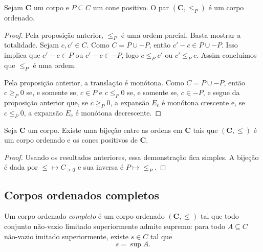 \begin{proposition}
Sejam $\bm C$ um corpo e $P \subseteq C$ um cone positivo. O par $(\bm C,\leq_P)$ é um corpo ordenado.
\end{proposition}
\begin{proof}
Pela proposição anterior, $\leq_P$ é uma ordem parcial. Basta mostrar a totalidade. Sejam $c,c' \in C$. Como $C=P \cup -P$, então $c'-c \in P \cup -P$. Isso implica que $c'-c \in P$ ou $c'-c \in -P$, logo $c \leq_P c'$ ou $c' \leq_P c$. Assim concluímos que $\leq_P$ é uma ordem.

Pela proposição anterior, a translação é monótona. Como $C=P \cup -P$, então $c \geq_P 0$ se, e somente se, $c \in P$ e $c \leq_P 0$ se, e somente se, $c \in -P$, e segue da proposição anterior que, se $c \geq_P 0$, a expansão $E_c$ é monótona crescente e, se $c \leq_P 0$, a expansão $E_c$ é monótona decrescente.
\end{proof}

\begin{proposition}
Seja $\bm C$ um corpo. Existe uma bijeção entre as ordens em $\bm C$ tais que $(\bm C,\leq)$ é um corpo ordenado e os cones positivos de $\bm C$.
\end{proposition}
\begin{proof}
Usando os resultados anteriores, essa demonstração fica simples. A bijeção é dada por $\leq \mapsto C_{\geq 0}$ e sua inversa é $P \mapsto \leq_P$.
\end{proof}

\subsection{Corpos ordenados completos}


\begin{definition}
Um corpo ordenado \emph{completo} é um corpo ordenado $(\bm C,\leq)$ tal que todo conjunto não-vazio limitado superiormente admite supremo: para todo $A \subseteq C$ não-vazio imitado superiormente, existe $s \in C$ tal que
	\begin{equation*}
	s = \sup A.
	\end{equation*}
\end{definition}

